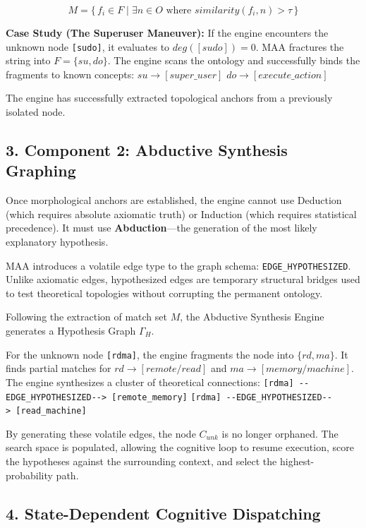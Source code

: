 \documentclass[
  11pt,
  a4paper,
]{article}
\begin{document}
\[ M = \{\, f_i \in F \mid \exists n \in O \text{ where } similarity(f_i, n) > \tau \,\} \]

\textbf{Case Study (The Superuser Maneuver):} If the engine encounters
the unknown node \texttt{{[}sudo{]}}, it evaluates to
\(deg([sudo]) = 0\). MAA fractures the string into \(F = \{su, do\}\).
The engine scans the ontology and successfully binds the fragments to
known concepts: \(su \rightarrow [super\_user]\)
\(do \rightarrow [execute\_action]\)

The engine has successfully extracted topological anchors from a
previously isolated node.

\subsection{3. Component 2: Abductive Synthesis
Graphing}\label{component-2-abductive-synthesis-graphing}

Once morphological anchors are established, the engine cannot use
Deduction (which requires absolute axiomatic truth) or Induction (which
requires statistical precedence). It must use \textbf{Abduction}---the
generation of the most likely explanatory hypothesis.

MAA introduces a volatile edge type to the graph schema:
\texttt{EDGE\_HYPOTHESIZED}. Unlike axiomatic edges, hypothesized edges
are temporary structural bridges used to test theoretical topologies
without corrupting the permanent ontology.

Following the extraction of match set \(M\), the Abductive Synthesis
Engine generates a Hypothesis Graph \(\Gamma_H\).

For the unknown node \texttt{{[}rdma{]}}, the engine fragments the node
into \(\{rd, ma\}\). It finds partial matches for
\(rd \rightarrow [remote / read]\) and
\(ma \rightarrow [memory / machine]\). The engine synthesizes a cluster
of theoretical connections:
\texttt{{[}rdma{]}\ -\/-EDGE\_HYPOTHESIZED-\/-\textgreater{}\ {[}remote\_memory{]}}
\texttt{{[}rdma{]}\ -\/-EDGE\_HYPOTHESIZED-\/-\textgreater{}\ {[}read\_machine{]}}

By generating these volatile edges, the node \(C_{unk}\) is no longer
orphaned. The search space is populated, allowing the cognitive loop to
resume execution, score the hypotheses against the surrounding context,
and select the highest-probability path.

\subsection{4. State-Dependent Cognitive
Dispatching}\label{state-dependent-cognitive-dispatching}
\end{document}
